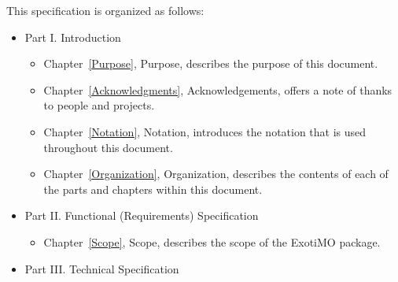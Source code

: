 \label{Organization}

This specification is organized as follows:

\begin{itemize}
\item 
Part I. Introduction

\begin{itemize}
\item
Chapter~\ref{Purpose}, Purpose, describes the purpose of this document.

\item
Chapter~\ref{Acknowledgments}, Acknowledgements, offers a note of
thanks to people and projects.

\item
Chapter~\ref{Notation}, Notation, introduces the notation that is used
throughout this document.

\item
Chapter~\ref{Organization}, Organization, describes the contents of
each of the parts and chapters within this document.
\end{itemize}

\item
Part II. Functional (\ie Requirements) Specification

\begin{itemize}
\item
Chapter~\ref{Scope}, Scope, describes the scope of the ExotiMO package.
\end{itemize}

\item
Part III. Technical Specification



\end{itemize}
